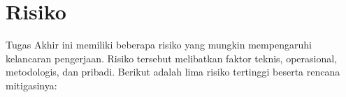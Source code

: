 \section{Risiko}
\label{sec:risiko}



Tugas Akhir ini memiliki beberapa risiko yang mungkin mempengaruhi kelancaran pengerjaan. Risiko tersebut melibatkan faktor teknis, operasional, metodologis, dan pribadi. Berikut adalah lima risiko tertinggi beserta rencana mitigasinya:

